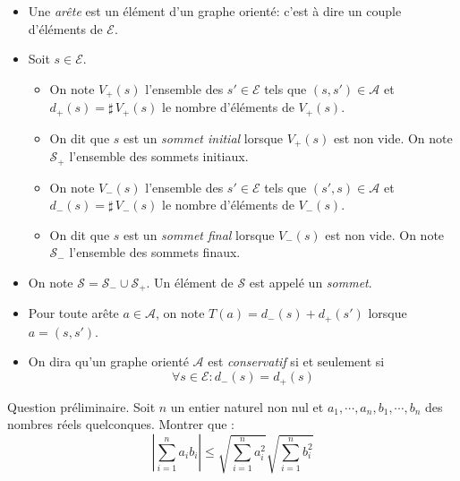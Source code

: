 \begin{itemize}
 \item Une \emph{arête} est un élément d'un graphe orienté: c'est à dire un couple d'éléments de $\mathcal{E}$.
 \item Soit $s\in \mathcal{E}$.
\begin{itemize}
 \item On note $V_+(s)$ l'ensemble des $s'\in \mathcal{E}$ tels que $(s,s')\in\mathcal{A}$ et $d_+(s) = \sharp \, V_+(s)$ le nombre d'éléments de $V_+(s)$.
 \item On dit que $s$ est un \emph{sommet initial} lorsque $V_+(s)$ est non vide. On note $\mathcal{S}_+$ l'ensemble des sommets initiaux.
 \item On note $V_-(s)$ l'ensemble des $s'\in \mathcal{E}$ tels que $(s',s)\in\mathcal{A}$ et $d_-(s) = \sharp \, V_-(s)$ le nombre d'éléments de $V_-(s)$.
 \item On dit que $s$ est un \emph{sommet final} lorsque $V_-(s)$ est non vide. On note $\mathcal{S}_-$ l'ensemble des sommets finaux.
\end{itemize}
 \item On note $\mathcal{S}=\mathcal{S}_- \cup \mathcal{S}_+$. Un élément de $\mathcal{S}$ est appelé un \emph{sommet}.
 \item Pour toute arête $a\in\mathcal{A}$, on note $T(a) = d_-(s) + d_+(s')$ lorsque $a=(s,s')$.
\item On dira qu'un graphe orienté $\mathcal A$ est \emph{conservatif} si et seulement si
\begin{displaymath}
 \forall s \in \mathcal E : d_-(s)=d_+(s) 
\end{displaymath}
\end{itemize}

Question préliminaire.\newline
Soit $n$ un entier naturel non nul et $a_1,\cdots,a_n, b_1,\cdots,b_n$ des nombres réels quelconques. Montrer que :
\begin{displaymath}
 \left \vert \sum_{i=1}^na_i b_i \right\vert
\leq
\sqrt{\sum_{i=1}^na_i^2} \sqrt{\sum_{i=1}^nb_i^2}
\end{displaymath}


